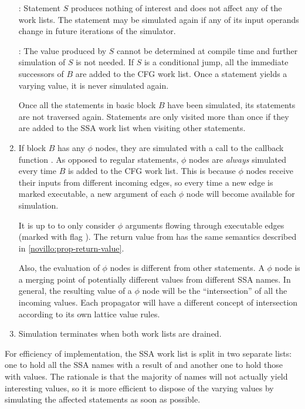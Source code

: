 \begin{enumerate}
	: Statement $S$
	produces nothing of interest and does not affect any of
	the work lists.  The statement may be simulated again if
	any of its input operands change in future iterations of
	the simulator.

	: The value produced
	by $S$ cannot be determined at compile time and further
	simulation of $S$ is not needed.  If $S$ is a conditional
	jump, all the immediate successors of $B$ are added to
	the CFG work list.  Once a statement yields a varying
	value, it is never simulated again.

	Once all the statements in basic block $B$ have been
	simulated, its statements are not traversed again.
	Statements are only visited more than once if they are
	added to the SSA work list when visiting other statements.

\item	If block $B$ has any $\phi$ nodes, they are simulated
	with a call to the callback function
	.  As opposed to regular
	statements, $\phi$ nodes are \textit{always} simulated
	every time $B$ is added to the CFG work list.  This is
	because $\phi$ nodes receive their inputs from different
	incoming edges, so every time a new edge is marked
	executable, a new argument of each $\phi$ node will
	become available for simulation.

	It is up to  to only
	consider $\phi$ arguments flowing through executable
	edges (marked with flag ). The
	return value from  has the
	same semantics described in \ref{novillo:prop-return-value}.

	Also, the evaluation of $\phi$ nodes is different from
	other statements.  A $\phi$ node is a merging point
	of potentially different values from different SSA
	names.  In general, the resulting value of a $\phi$ node
	will be the ``intersection'' of all the incoming values.
	Each propagator will have a different concept of
	intersection according to its own lattice value rules.

\item	Simulation terminates when both work lists are drained.
\end{enumerate}

For efficiency of implementation, the SSA work list is split in
two separate lists: one to hold all the SSA names with a result
of  and another one to hold those with
 values.  The rationale is that
the majority of names will not actually yield interesting values,
so it is more efficient to dispose of the varying values by
simulating the affected statements as soon as possible.

